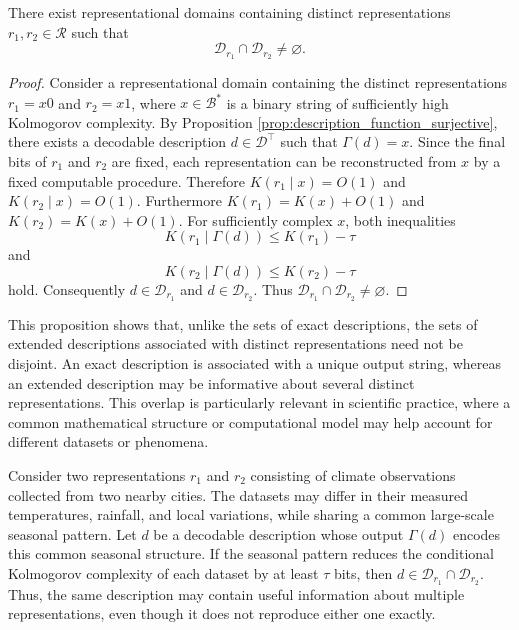 \begin{proposition}
\label{prop:extended_descriptions_not_disjoint}
There exist representational domains containing distinct representations $r_1,r_2\in\mathcal{R}$ such that
\[
\mathcal{D}_{r_1}\cap\mathcal{D}_{r_2}
\neq\varnothing.
\]
\end{proposition}

\begin{proof}
Consider a representational domain containing the distinct representations $r_1=x0$ and $r_2=x1$, where $x\in\mathcal{B}^\ast$ is a binary string of sufficiently high Kolmogorov complexity. By Proposition \ref{prop:description_function_surjective}, there exists a decodable description $d\in\mathcal{D}^\top$ such that $\Gamma(d)=x$. Since the final bits of $r_1$ and $r_2$ are fixed, each representation can be reconstructed from $x$ by a fixed computable procedure. Therefore $K(r_1\mid x)=O(1)$ and $K(r_2\mid x)=O(1)$. Furthermore $K(r_1)=K(x)+O(1)$ and $K(r_2)=K(x)+O(1)$. For sufficiently complex $x$, both inequalities
\[
K(r_1\mid\Gamma(d))\leq K(r_1)-\tau
\]
and
\[
K(r_2\mid\Gamma(d))\leq K(r_2)-\tau
\]
hold. Consequently $d\in\mathcal{D}_{r_1}$ and $d\in\mathcal{D}_{r_2}$. Thus $\mathcal{D}_{r_1}\cap\mathcal{D}_{r_2} \neq \varnothing$.
\end{proof}

This proposition shows that, unlike the sets of exact descriptions, the sets of extended descriptions associated with distinct representations need not be disjoint. An exact description is associated with a unique output string, whereas an extended description may be informative about several distinct representations. This overlap is particularly relevant in scientific practice, where a common mathematical structure or computational model may help account for different datasets or phenomena.

\begin{example}
Consider two representations $r_1$ and $r_2$ consisting of climate observations collected from two nearby cities. The datasets may differ in their measured temperatures, rainfall, and local variations, while sharing a common large-scale seasonal pattern. Let $d$ be a decodable description whose output $\Gamma(d)$ encodes this common seasonal structure. If the seasonal pattern reduces the conditional Kolmogorov complexity of each dataset by at least $\tau$ bits, then $d\in\mathcal{D}_{r_1} \cap \mathcal{D}_{r_2}$. Thus, the same description may contain useful information about multiple representations, even though it does not reproduce either one exactly.
\end{example}

